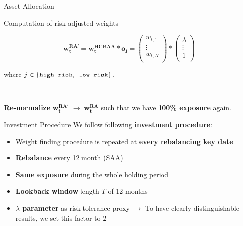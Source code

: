 \begin{frame}{Asset Allocation}

Computation of risk adjusted weights 

\begin{equation*}
    \mathbf{w_t^{RA'}} = \mathbf{w_t^{HCBAA}} * \mathbf{o_j} = \left( \begin{matrix} w_{t,1}  \\ \vdots  \\ w_{t,N} \\ \end{matrix} \right) * \left( \begin{matrix} \lambda  \\ \vdots  \\ 1 \\ \end{matrix} \right)
\end{equation*}

\vspace{0.2cm}

where $j \in \{ \text{\texttt{high risk}}, \text{\texttt{ low risk}} \} $.

\\\vspace{0.2cm}

\textbf{Re-normalize} $\mathbf{w_t^{RA'}}$ $\rightarrow$ $\mathbf{w_t^{RA}}$ such that we have \textbf{100\% exposure} again.
\end{frame}

\begin{frame}{Investment Procedure}
We follow following \textbf{investment procedure}:
\vspace{0.4cm}

\begin{itemize}
    \item Weight finding procedure is repeated at \textbf{every rebalancing key date}
    \item \textbf{Rebalance} every 12 month (SAA)
    \item \textbf{Same exposure} during the whole holding period
    \item \textbf{Lookback window} length $T$ of 12 months
    \item \textbf{$\lambda$ parameter} as risk-tolerance proxy $\rightarrow$ To have clearly distinguishable results, we set this factor to $2$
\end{itemize}

\end{frame}